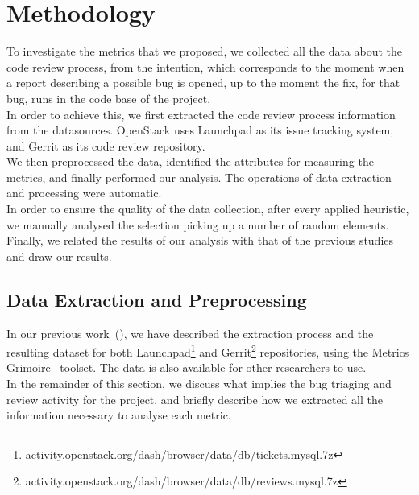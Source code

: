 \documentclass[10pt, conference]{IEEEtran}
\begin{document}
\section{Methodology}
To investigate the metrics that we proposed, we collected all the data about 
the code review process, from the intention, which corresponds to the moment when 
a report describing a possible bug is opened, 
up to the moment the fix, for that bug, runs in the code base of the project.
\\
In order to achieve this, we first extracted the code review process 
information from the datasources. OpenStack uses Launchpad as its 
issue tracking system, and Gerrit as its 
code review repository.
\\
We then preprocessed the data, identified the attributes for
measuring the metrics, and finally performed our analysis.
The operations of data extraction and processing were automatic. 
\\
In order to ensure the quality 
of the data collection,
after every applied heuristic, we manually analysed the
selection picking up a number of random elements.
Finally, we related the results of our analysis with that of the previous
studies and draw our results.

\subsection{Data Extraction and Preprocessing}

In our previous work~(\cite{bib16,bib17}), we have described the extraction process and the 
resulting dataset for both Launchpad\footnote{activity.openstack.org/dash/browser/data/db/tickets.mysql.7z} 
and Gerrit\footnote{activity.openstack.org/dash/browser/data/db/reviews.mysql.7z} repositories, 
using the Metrics Grimoire~\cite{bib20} toolset. 
The data is also available for other researchers to use. 
\\
In the remainder of this section, we
discuss what implies the bug triaging and review activity for the project, and briefly
describe how we extracted all the information necessary to analyse each metric.
\\
\end{document}
